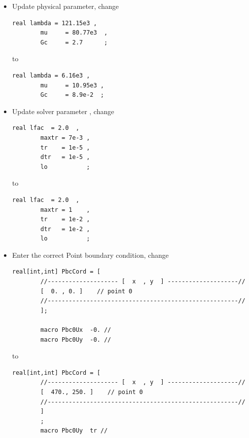 \begin{itemize}
	
	\item Update physical parameter, change
	
	\begin{lstlisting}[style=CppStyle]
		real lambda = 121.15e3 ,
		mu     = 80.77e3  ,
		Gc     = 2.7      ; 
	\end{lstlisting}
	
	to
	
	\begin{lstlisting}[style=CppStyle]
		real lambda = 6.16e3 ,
		mu     = 10.95e3 ,
		Gc     = 8.9e-2  ;
	\end{lstlisting}
	
	\item Update solver parameter , change
	
	\begin{lstlisting}[style=CppStyle]
		real lfac  = 2.0  ,
		maxtr = 7e-3 ,
		tr    = 1e-5 ,
		dtr   = 1e-5 ,
		lo           ; 
	\end{lstlisting}
	
	to
	
	\begin{lstlisting}[style=CppStyle]
		real lfac  = 2.0  ,
		maxtr = 1    ,
		tr    = 1e-2 ,
		dtr   = 1e-2 ,
		lo           ; 
	\end{lstlisting}
	
	
	\item Enter the correct Point boundary condition, change
	
	\begin{lstlisting}[style=CppStyle]
		real[int,int] PbcCord = [
		//-------------------- [  x  , y  ] --------------------//
		[  0. , 0. ]    // point 0                       
		//------------------------------------------------------//
		];
		
		macro Pbc0Ux  -0. //
		macro Pbc0Uy  -0. //
	\end{lstlisting}
	
	to 
	
	\begin{lstlisting}[style=CppStyle]
		real[int,int] PbcCord = [
		//-------------------- [  x  , y  ] --------------------//
		[  470., 250. ]    // point 0                       
		//------------------------------------------------------//
		]
		;
		macro Pbc0Uy  tr //
	\end{lstlisting}
	
\end{itemize}


